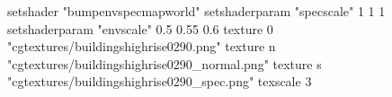 setshader "bumpenvspecmapworld"
setshaderparam "specscale" 1 1 1
setshaderparam "envscale"  0.5 0.55 0.6
    texture 0 "cgtextures/buildingshighrise0290.png"
    texture n "cgtextures/buildingshighrise0290_normal.png"
    texture s "cgtextures/buildingshighrise0290_spec.png"
    texscale 3